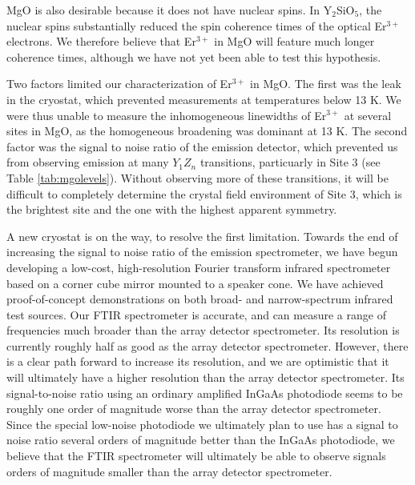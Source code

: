 \documentclass[12pt]{report}
\newcommand{\erbium}[1][ ]{Er$^{3+}$#1}
\newcommand{\YSO}[1][ ]{Y$_{2}$SiO$_{5}$#1}
\begin{document}
MgO is also desirable because it does not have nuclear spins. In \YSO[], the nuclear spins substantially reduced the spin coherence times of the optical \erbium electrons. We therefore believe that \erbium in MgO will feature much longer coherence times, although we have not yet been able to test this hypothesis.

Two factors limited our characterization of \erbium in MgO. The first was the leak in the cryostat, which prevented measurements at temperatures below 13 K. We were thus unable to measure the inhomogeneous linewidths of \erbium at several sites in MgO, as the homogeneous broadening was dominant at 13 K. The second factor was the signal to noise ratio of the emission detector, which prevented us from observing emission at many $Y_{1}Z_{n}$ transitions, particuarly in Site 3 (see Table \ref{tab:mgolevels}). Without observing more of these transitions, it will be difficult to completely determine the crystal field environment of Site 3, which is the brightest site and the one with the highest apparent symmetry.

A new cryostat is on the way, to resolve the first limitation. Towards the end of increasing the signal to noise ratio of the emission spectrometer, we have begun developing a low-cost, high-resolution Fourier transform infrared spectrometer based on a corner cube mirror mounted to a speaker cone. We have achieved proof-of-concept demonstrations on both broad- and narrow-spectrum infrared test sources. Our FTIR spectrometer is accurate, and can measure a range of frequencies much broader than the array detector spectrometer. Its resolution is currently roughly half as good as the array detector spectrometer. However, there is a clear path forward to increase its resolution, and we are optimistic that it will ultimately have a higher resolution than the array detector spectrometer. Its signal-to-noise ratio using an ordinary amplified InGaAs photodiode seems to be roughly one order of magnitude worse than the array detector spectrometer. Since the special low-noise photodiode we ultimately plan to use has a signal to noise ratio several orders of magnitude better than the InGaAs photodiode, we believe that the FTIR spectrometer will ultimately be able to observe signals orders of magnitude smaller than the array detector spectrometer.
\end{document}
